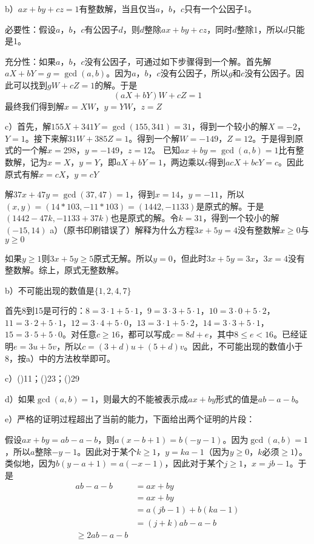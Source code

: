 b）$ax+by+cz=1$有整数解，当且仅当$a$，$b$，$c$只有一个公因子1。\par
\proof 必要性：假设$a$，$b$，$c$有公因子$d$，则$d$整除$ax+by+cz$，同时$d$整除1，所以$d$只能是1。\par
充分性：如果$a$，$b$，$c$没有公因子，可通过如下步骤得到一个解。首先解$aX+bY=g=\gcd(a,b)$。因为$a$，$b$，$c$没有公因子，所以$g$和$c$没有公因子。因此可以找到$gW+cZ=1$的解。于是
\[(aX+bY)W +cZ=1\]
最终我们得到解$x=XW$，$y=YW$，$z=Z$\par
c）首先，解$155X+341Y=\gcd(155, 341)=31$，得到一个较小的解$X=-2$，$Y=1$。接下来解$31W+385Z=1$。得到一个解$W=-149$，$Z=12$。于是得到原式的一个解$x=298$，$y=-149$，$z=12$。
%
\exercise \proof 已知$ax+by=\gcd(a,b)=1$比有整数解，记为$x=X$，$y=Y$，即$aX+bY=1$，两边乘以$c$得到$acX+bcY=c$。因此原式有解$x=cX$，$y=cY$\par
解$37x+47y=\gcd(37, 47)=1$，得到$x=14$，$y=-11$，所以$(x,y)=(14*103, -11*103)=(1442, -1133)$是原式的解。于是$(1442 - 47k, -1133+37k)$也是原式的解。令$k=31$，得到一个较小的解$(-15, 14)$
%
\exercise a）（原书印刷错误了）解释为什么方程$3x+5y=4$没有整数解$x\ge0$与$y\ge 0$\par
\proof 如果$y\ge1$则$3x+5y\ge5$原式无解。所以$y=0$，但此时$3x+5y=3x$，$3x=4$没有整数解。综上，原式无整数解。\par
b）不可能出现的数值是$\{1, 2, 4, 7\}$\par
\proof 首先8到15是可行的：$8=3\cdot1+5\cdot1$，$9=3\cdot3+5\cdot1$，$10=3\cdot0+5\cdot2$，$11=3\cdot2+5\cdot1$，$12=3\cdot4+5\cdot0$，$13=3\cdot1+5\cdot2$，$14=3\cdot3+5\cdot1$，$15=3\cdot5+5\cdot0$。对任意$c\ge 16$，都可以写成$c=8d+e$，其中$8\le e<16$。已经证明$e=3u+5v$，所以$c=(3+d)u+(5+d)v$。因此，不可能出现的数值小于8，按a）中的方法枚举即可。\par
c）()11；()23；()29\par
d）如果$\gcd(a, b)=1$，则最大的不能被表示成$ax+by$形式的值是$ab-a-b$。\par
e）严格的证明过程超出了当前的能力，下面给出两个证明的片段：\par
{}\par
假设$ax+by=ab-a-b$，则$a(x-b+1)=b(-y-1)$。因为$\gcd(a,b)=1$，所以$a$整除$-y-1$。因此对于某个$k\ge1$，$y=ka-1$（因为$y\ge0$，$k$必须$\ge1$）。类似地，因为$b(y-a+1)=a(-x-1)$，因此对于某个$j\ge1$，$x=jb-1$。于是
\begin{align*}
ab-a-b &= ax+by \\
&= ax+by \\
&= a(jb-1)+b(ka-1) \\ 
&= (j+k)ab - a - b \\
\ge 2ab-a-b
\end{align*}
